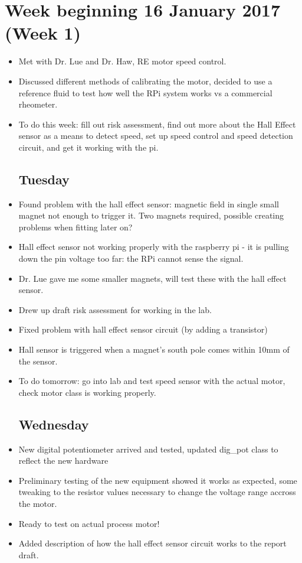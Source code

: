 \documentclass[a4]{report}
\begin{document}
	\section{Week beginning 16 January 2017 (Week 1)}
	\begin{itemize}
		\subsection*{Monday}
		\item Met with Dr. Lue and Dr. Haw, RE motor speed control.
		\item Discussed different methods of calibrating the motor, decided to use a reference fluid to test how well the RPi system works vs a commercial rheometer.
		\item  To do this week: fill out risk assessment, find out more about the Hall Effect sensor as a means to detect speed, set up speed control and speed detection circuit, and get it working with the pi.
		\subsection*{Tuesday}
		\item Found problem with the hall effect sensor: magnetic field in single small magnet not enough to trigger it. Two magnets required, possible creating problems when fitting later on?
		\item Hall effect sensor not working properly with the raspberry pi - it is pulling down the pin voltage too far: the RPi cannot sense the signal.
		\item Dr. Lue gave me some smaller magnets, will test these with the hall effect sensor.
		\item Drew up draft risk assessment for working in the lab.
		\item Fixed problem with hall effect sensor circuit (by adding a transistor)
		\item Hall sensor is triggered when a magnet's south pole comes within 10mm of the sensor.
		\item To do tomorrow: go into lab and test speed sensor with the actual motor, check motor class is working properly.
		\subsection*{Wednesday}
		\item New digital potentiometer arrived and tested, updated dig\_pot class to reflect the new hardware
		\item Preliminary testing of the new equipment showed it works as expected, some tweaking to the resistor values necessary to change the voltage range accross the motor. 
		\item Ready to test on actual process motor!
		\item Added description of how the hall effect sensor circuit works to the report draft.

\end{itemize}
\end{document}
